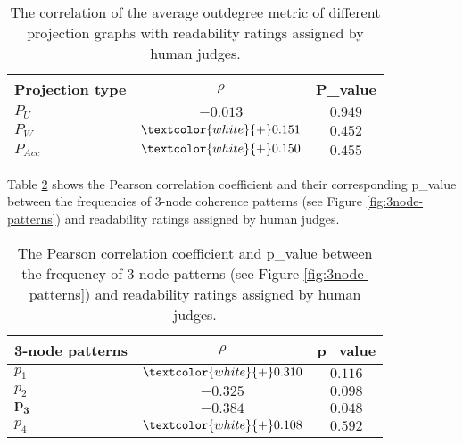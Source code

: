 \begin{table}[!ht]
	\begin{center}
		\begin{tabular}{lcc}
			\toprule
 			\textbf{Projection type}& $\rho$  & \textbf{P\_value}\\
 			\midrule
			$P_U$ 				& $-0.013$ 						& $0.949$ \\
			$P_W$ 				& $\textcolor{white}{+}0.151$  	& $0.452$ \\
			$P_{Acc}$ 			& $\textcolor{white}{+}0.150$ 	& $0.455$ \\
			\bottomrule
		\end{tabular}
	\end{center}
	\caption{The correlation of the average outdegree metric of different projection graphs with readability ratings assigned by human judges.}
 	\label{tab:correlation-outdegree}
\end{table}


Table \ref{tab:correlation-3node} shows the Pearson correlation coefficient and their corresponding p\_value between the frequencies of 3-node coherence patterns (see Figure \ref{fig:3node-patterns}) and readability ratings assigned by human judges. 

\begin{table}[!ht]
	\begin{center}
		\begin{tabular}{lcc}
		\toprule
  	 	\textbf{3-node patterns} & $\rho$ 		& \textbf{p\_value}	 \\
  	 	\midrule
 		$p_1$ 			& $\textcolor{white}{+}0.310$ & $0.116$ 		\\
 		$p_2$ 			& $-0.325$ 				      & $0.098$ 		\\
		$\mathbf{p_3}$ 	& $\mathbf{-0.384}$ 		  & $\mathbf{0.048}$\\
 		$p_4$ 			& $\textcolor{white}{+}0.108$ & $0.592$			\\
 		\bottomrule
		\end{tabular}
	\end{center}
	\caption{The Pearson correlation coefficient and p\_value between the frequency of \mbox{3-node} patterns (see Figure \ref{fig:3node-patterns}) and readability ratings assigned by human judges.} 
 	\label{tab:correlation-3node}
\end{table}

